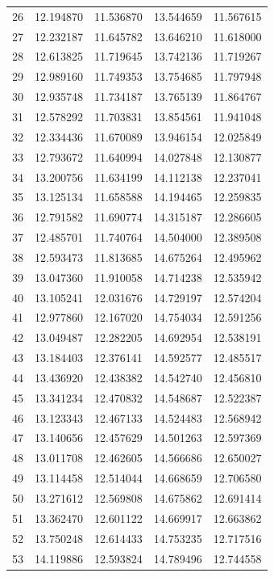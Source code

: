 \begin{table}
\begin{tabular}{rrrrr}
26 & 12.194870 & 11.536870 & 13.544659 & 11.567615 \\
27 & 12.232187 & 11.645782 & 13.646210 & 11.618000 \\
28 & 12.613825 & 11.719645 & 13.742136 & 11.719267 \\
29 & 12.989160 & 11.749353 & 13.754685 & 11.797948 \\
30 & 12.935748 & 11.734187 & 13.765139 & 11.864767 \\
31 & 12.578292 & 11.703831 & 13.854561 & 11.941048 \\
32 & 12.334436 & 11.670089 & 13.946154 & 12.025849 \\
33 & 12.793672 & 11.640994 & 14.027848 & 12.130877 \\
34 & 13.200756 & 11.634199 & 14.112138 & 12.237041 \\
35 & 13.125134 & 11.658588 & 14.194465 & 12.259835 \\
36 & 12.791582 & 11.690774 & 14.315187 & 12.286605 \\
37 & 12.485701 & 11.740764 & 14.504000 & 12.389508 \\
38 & 12.593473 & 11.813685 & 14.675264 & 12.495962 \\
39 & 13.047360 & 11.910058 & 14.714238 & 12.535942 \\
40 & 13.105241 & 12.031676 & 14.729197 & 12.574204 \\
41 & 12.977860 & 12.167020 & 14.754034 & 12.591256 \\
42 & 13.049487 & 12.282205 & 14.692954 & 12.538191 \\
43 & 13.184403 & 12.376141 & 14.592577 & 12.485517 \\
44 & 13.436920 & 12.438382 & 14.542740 & 12.456810 \\
45 & 13.341234 & 12.470832 & 14.548687 & 12.522387 \\
46 & 13.123343 & 12.467133 & 14.524483 & 12.568942 \\
47 & 13.140656 & 12.457629 & 14.501263 & 12.597369 \\
48 & 13.011708 & 12.462605 & 14.566686 & 12.650027 \\
49 & 13.114458 & 12.514044 & 14.668659 & 12.706580 \\
50 & 13.271612 & 12.569808 & 14.675862 & 12.691414 \\
51 & 13.362470 & 12.601122 & 14.669917 & 12.663862 \\
52 & 13.750248 & 12.614433 & 14.753235 & 12.717516 \\
53 & 14.119886 & 12.593824 & 14.789496 & 12.744558 \\

\end{tabular}
\end{table}
